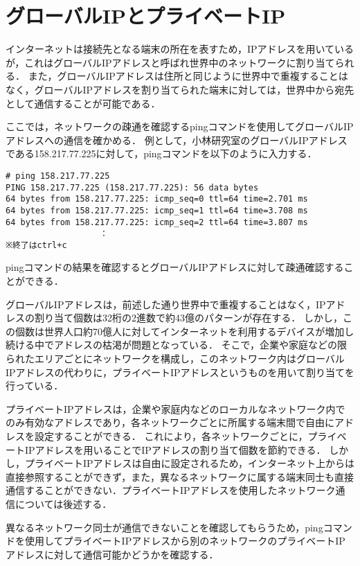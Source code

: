 \section{グローバルIPとプライベートIP}
インターネットは接続先となる端末の所在を表すため，IPアドレスを用いているが，これはグローバルIPアドレスと呼ばれ世界中のネットワークに割り当てられる．
また，グローバルIPアドレスは住所と同じように世界中で重複することはなく，グローバルIPアドレスを割り当てられた端末に対しては，世界中から宛先として通信することが可能である．\par
ここでは，ネットワークの疎通を確認するpingコマンドを使用してグローバルIPアドレスへの通信を確かめる．
例として，小林研究室のグローバルIPアドレスである158.217.77.225に対して，pingコマンドを以下のように入力する．
\begin{screen}
\begin{Verbatim}[frame=single]
# ping 158.217.77.225
PING 158.217.77.225 (158.217.77.225): 56 data bytes
64 bytes from 158.217.77.225: icmp_seq=0 ttl=64 time=2.701 ms
64 bytes from 158.217.77.225: icmp_seq=1 ttl=64 time=3.708 ms
64 bytes from 158.217.77.225: icmp_seq=2 ttl=64 time=3.807 ms
                   ：
※終了はctrl+c
\end{Verbatim}
\end{screen}
pingコマンドの結果を確認するとグローバルIPアドレスに対して疎通確認することができる．\par
グローバルIPアドレスは，前述した通り世界中で重複することはなく，IPアドレスの割り当て個数は32桁の2進数で約43億のパターンが存在する．
しかし，この個数は世界人口約70億人に対してインターネットを利用するデバイスが増加し続ける中でアドレスの枯渇が問題となっている．
そこで，企業や家庭などの限られたエリアごとにネットワークを構成し，このネットワーク内はグローバルIPアドレスの代わりに，プライベートIPアドレスというものを用いて割り当てを行っている．\par
プライベートIPアドレスは，企業や家庭内などのローカルなネットワーク内でのみ有効なアドレスであり，各ネットワークごとに所属する端末間で自由にアドレスを設定することができる．
これにより，各ネットワークごとに，プライベートIPアドレスを用いることでIPアドレスの割り当て個数を節約できる．
しかし，プライベートIPアドレスは自由に設定されるため，インターネット上からは直接参照することができず，また，異なるネットワークに属する端末同士も直接通信することができない．プライベートIPアドレスを使用したネットワーク通信については後述する．
\par
異なるネットワーク同士が通信できないことを確認してもらうため，pingコマンドを使用してプライベートIPアドレスから別のネットワークのプライベートIPアドレスに対して通信可能かどうかを確認する．
